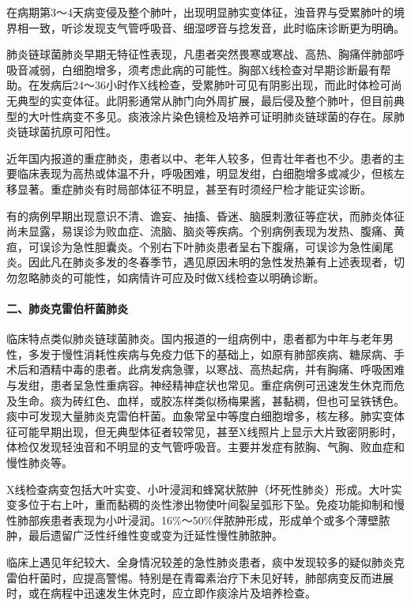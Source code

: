 在病期第3～4天病变侵及整个肺叶，出现明显肺实变体征，浊音界与受累肺叶的境界相一致，听诊发现支气管呼吸音、细湿啰音与捻发音，此时临床诊断更为明确。

肺炎链球菌肺炎早期无特征性表现，凡患者突然畏寒或寒战、高热、胸痛伴肺部呼吸音减弱，白细胞增多，须考虑此病的可能性。胸部X线检查对早期诊断最有帮助。在发病后24～36小时作X线检查，受累肺叶可见有阴影出现，而此时体检可尚无典型的实变体征。此阴影通常从肺门向外周扩展，最后侵及整个肺叶，但目前典型的大叶性病变不多见。痰液涂片染色镜检及培养可证明肺炎链球菌的存在。尿肺炎链球菌抗原可阳性。

近年国内报道的重症肺炎，患者以中、老年人较多，但青壮年者也不少。患者的主要临床表现为高热或体温不升，呼吸困难，明显发绀，白细胞增多或减少，但核左移显著。重症肺炎有时局部体征不明显，甚至有时须经尸检才能证实诊断。

有的病例早期出现意识不清、谵妄、抽搐、昏迷、脑膜刺激征等症状，而肺炎体征尚未显露，易误诊为败血症、流脑、脑炎等疾病。个别病例表现为发热、腹痛、黄疸，可误诊为急性胆囊炎。个别右下叶肺炎患者呈右下腹痛，可误诊为急性阑尾炎。因此凡在肺炎多发的冬春季节，遇见原因未明的急性发热兼有上述表现者，切勿忽略肺炎的可能性，如病情许可应及时做X线检查以明确诊断。

\paragraph{二、肺炎克雷伯杆菌肺炎}

临床特点类似肺炎链球菌肺炎。国内报道的一组病例中，患者都为中年与老年男性，多发于慢性消耗性疾病与免疫力低下的基础上，如原有肺部疾病、糖尿病、手术后和酒精中毒的患者。此病发病急骤，以寒战、高热起病，并有胸痛、呼吸困难与发绀，患者呈急性重病容。神经精神症状也常见。重症病例可迅速发生休克而危及生命。痰为砖红色、血样，或胶冻样类似杨梅果酱，甚黏稠，但也可呈铁锈色。痰中可发现大量肺炎克雷伯杆菌。血象常呈中等度白细胞增多，核左移。肺实变体征可能早期出现，但无典型体征者较常见，甚至X线照片上显示大片致密阴影时，体检仅发现轻浊音和不明显的支气管呼吸音。主要并发症有脓胸、气胸、败血症和慢性肺炎等。

X线检查病变包括大叶实变、小叶浸润和蜂窝状脓肿（坏死性肺炎）形成。大叶实变多位于右上叶，重而黏稠的炎性渗出物使叶间裂呈弧形下坠。免疫功能抑制和慢性肺部疾患者表现为小叶浸润。16\%～50\%伴脓肿形成，形成单个或多个薄壁脓肿，最后遗留广泛性纤维性变或变为迁延性慢性肺脓肿。

临床上遇见年纪较大、全身情况较差的急性肺炎患者，痰中发现较多的疑似肺炎克雷伯杆菌时，应提高警惕。特别是在青霉素治疗下未见好转，肺部病变反而进展时，或在病程中迅速发生休克时，应立即作痰涂片及培养检查。

